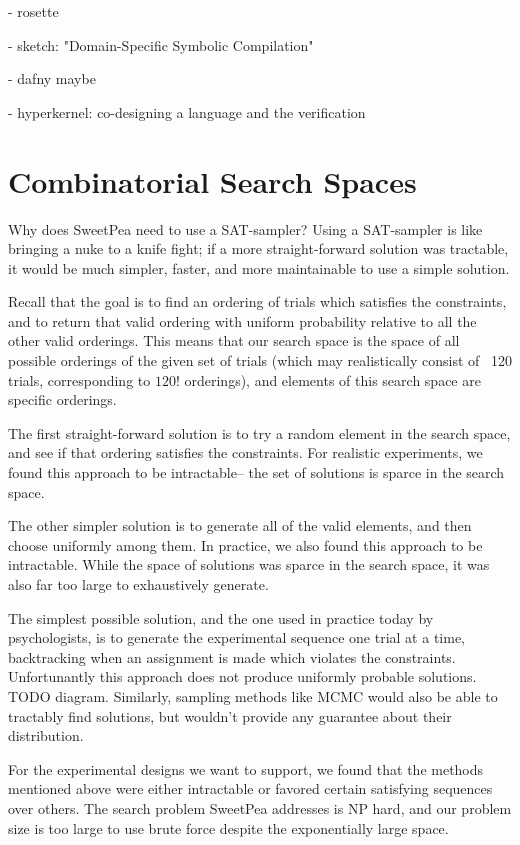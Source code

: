 - rosette \cite{torlak2014lightweight}

- sketch: "Domain-Specific Symbolic Compilation"

- dafny maybe

- hyperkernel: co-designing a language and the verification


\section{Combinatorial Search Spaces}

Why does SweetPea need to use a SAT-sampler? Using a SAT-sampler is like bringing a nuke to a knife fight; if a more straight-forward solution was tractable, it would be much simpler, faster, and more maintainable to use a simple solution.

Recall that the goal is to find an ordering of trials which satisfies the constraints, and to return that valid ordering with uniform probability relative to all the other valid orderings. This means that our search space is the space of all possible orderings of the given set of trials (which may realistically consist of ~120 trials, corresponding to $120!$ orderings), and elements of this search space are specific orderings.

The first straight-forward solution is to try a random element in the search space, and see if that ordering satisfies the constraints. For realistic experiments, we found this approach to be intractable-- the set of solutions is sparce in the search space.

The other simpler solution is to generate all of the valid elements, and then choose uniformly among them. In practice, we also found this approach to be intractable. While the space of solutions was sparce in the search space, it was also far too large to exhaustively generate.

The simplest possible solution, and the one used in practice today by psychologists, is to generate the experimental sequence one trial at a time, backtracking when an assignment is made which violates the constraints. Unfortunantly this approach does not produce uniformly probable solutions. TODO diagram. Similarly, sampling methods like MCMC would also be able to tractably find solutions, but wouldn't provide any guarantee about their distribution.

For the experimental designs we want to support, we found that the methods mentioned above were either intractable or favored certain satisfying sequences over others. The search problem SweetPea addresses is NP hard, and our problem size is too large to use brute force despite the exponentially large space.

